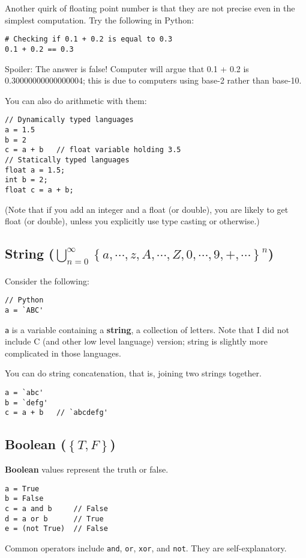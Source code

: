 \documentclass[12pt, a4paper]{article}
\theoremstyle{definition}
\begin{document}
Another quirk of floating point number is that they are not precise
even in the simplest computation.
Try the following in Python:
\begin{lstlisting}
# Checking if 0.1 + 0.2 is equal to 0.3
0.1 + 0.2 == 0.3
\end{lstlisting}
Spoiler: The answer is false!
Computer will argue that
0.1 + 0.2 is 0.30000000000000004; this is due to computers using base-2 rather than base-10.

You can also do arithmetic with them:
\begin{lstlisting}
// Dynamically typed languages
a = 1.5
b = 2
c = a + b   // float variable holding 3.5
// Statically typed languages
float a = 1.5;
int b = 2;
float c = a + b;
\end{lstlisting}
(Note that if you add an integer and a float (or double), you are likely to get float (or double),
unless you explicitly use type casting or otherwise.)

\subsection{String ($\bigcup_{n = 0}^{\infty} \left\{ a, \cdots, z, A, \cdots, Z, 0, \cdots, 9, +, \cdots \right\}^n$)}
Consider the following:
\begin{lstlisting}
// Python
a = `ABC'
\end{lstlisting}
\lstinline{a} is a variable containing a \textbf{string}, a collection of letters.
Note that I did not include C (and other low level language) version;
string is slightly more complicated in those languages.

You can do string concatenation, that is, joining two strings together.
\begin{lstlisting}
a = `abc'
b = `defg'
c = a + b   // `abcdefg'
\end{lstlisting}

\subsection{Boolean ($\left\{ T, F \right\}$)}
\textbf{Boolean} values represent the truth or false.
\begin{lstlisting}
a = True
b = False
c = a and b     // False
d = a or b      // True
e = (not True)  // False
\end{lstlisting}
Common operators include \lstinline{and}, \lstinline{or}, \lstinline{xor}, and \lstinline{not}.
They are self-explanatory.
\end{document}
